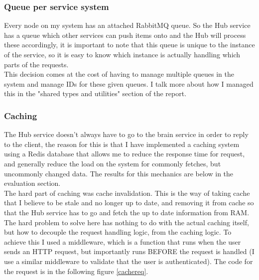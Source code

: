 \documentclass[titlepage]{article}
\begin{document}
\subsubsection{Queue per service system}
\label{one_queue}
Every node on my system has an attached RabbitMQ queue. So the Hub service has a queue which other services can push items onto and the Hub will process these accordingly, it is important to note that this queue is unique to the instance of the service, so it is easy to know which instance is actually handling which parts of the requests. \\

This decision comes at the cost of having to manage multiple queues in the system and manage IDs for these given queues. I talk more about how I managed this in the "shared types and utilities" section of the report.

\pagebreak
\subsubsection{Caching}
The Hub service doesn't always have to go to the brain service in order to reply to the client, the reason for this is that I have implemented a caching system using a Redis database that allows me to reduce the response time for request, and generally reduce the load on the system for commonly fetches, but uncommonly changed data. The results for this mechanics are below in the evaluation section. \\

The hard part of caching was cache invalidation. This is the way of taking cache that I believe to be stale and no longer up to date, and removing it from cache so that the Hub service has to go and fetch the up to date information from RAM. \\

The hard problem to solve here has nothing to do with the actual caching itself, but how to decouple the request handling logic, from the caching logic. To achieve this I used a middleware, which is a function that runs when the user sends an HTTP request, but importantly runs BEFORE the request is handled (I use a similar middleware to validate that the user is authenticated). The code for the request is in the following figure \ref{cachereq}.
\end{document}

